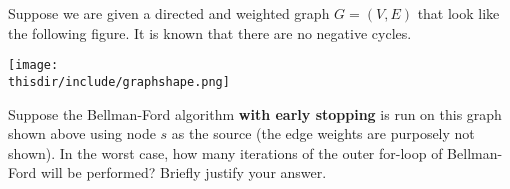 \begin{prob}
    Suppose we are given a directed and weighted graph $G = (V, E)$ that look like the following figure. It is known that there are no negative cycles.

    \begin{center}
        \texttt{[image: \\thisdir/include/graphshape.png]}
    \end{center}

    Suppose the Bellman-Ford algorithm {\bf with early stopping} is run on this graph shown above using node $s$ as the source (the edge weights are purposely not shown). In the worst case, how many iterations of the outer for-loop of Bellman-Ford will be performed?  Briefly justify your answer.

   \begin{soln}
   \end{soln}
\end{prob}
